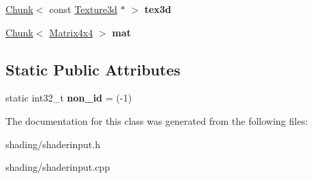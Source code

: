 \begin{DoxyCompactItemize}
\item 
\hypertarget{class_tempest_1_1_shader_input_a702ca6da4ea3f6eb19a5e3e3fb8c2355}{\hyperlink{struct_tempest_1_1_shader_input_1_1_chunk}{Chunk}$<$ const \hyperlink{class_tempest_1_1_texture3d}{Texture3d} $\ast$ $>$ {\bfseries tex3d}}\label{class_tempest_1_1_shader_input_a702ca6da4ea3f6eb19a5e3e3fb8c2355}

\item 
\hypertarget{class_tempest_1_1_shader_input_aab79c878a9d4910754d76fe24026d7fb}{\hyperlink{struct_tempest_1_1_shader_input_1_1_chunk}{Chunk}$<$ \hyperlink{class_tempest_1_1_matrix4x4}{Matrix4x4} $>$ {\bfseries mat}}\label{class_tempest_1_1_shader_input_aab79c878a9d4910754d76fe24026d7fb}

\end{DoxyCompactItemize}
\subsection*{Static Public Attributes}
\begin{DoxyCompactItemize}
\item 
\hypertarget{class_tempest_1_1_shader_input_a2b9e24eba0e45939de41f29f2778a25c}{static int32\+\_\+t {\bfseries non\+\_\+id} = (-\/1)}\label{class_tempest_1_1_shader_input_a2b9e24eba0e45939de41f29f2778a25c}

\end{DoxyCompactItemize}


The documentation for this class was generated from the following files\+:\begin{DoxyCompactItemize}
\item 
shading/shaderinput.\+h\item 
shading/shaderinput.\+cpp\end{DoxyCompactItemize}
